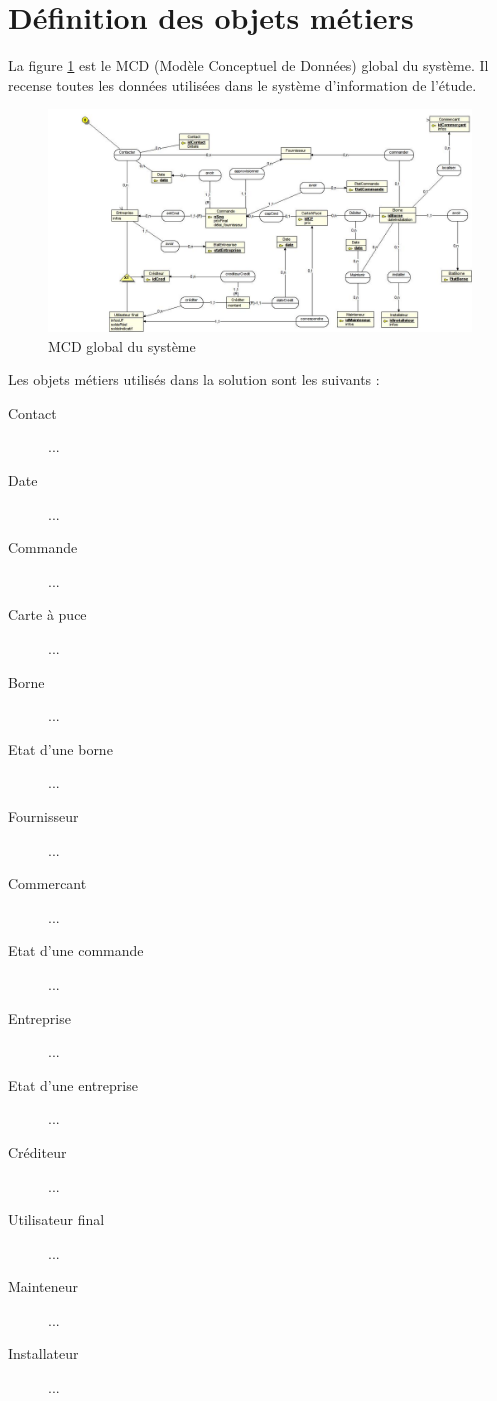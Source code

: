 




\section{Définition des objets métiers}
La figure \ref{fig:mcd} est le MCD (Modèle Conceptuel de Données) global du
système. Il recense toutes les données utilisées dans le système d'information
de l'étude. \\

\begin{landscape}
  \begin{figure}[ht]
      \centering
      \includegraphics[width=0.7\paperheight]{mcd}
      \caption{MCD global du système}
      \label{fig:mcd}
  \end{figure}
\end{landscape}

Les objets métiers utilisés dans la solution sont les suivants : \\
\begin{description}
  \item[Contact] ...
  \item[Date] ...
  \item[Commande] ...
  \item[Carte à puce] ...
  \item[Borne] ...
  \item[Etat d'une borne] ...
  \item[Fournisseur] ...
  \item[Commercant] ...
  \item[Etat d'une commande] ...
  \item[Entreprise] ...
  \item[Etat d'une entreprise] ...
  \item[Créditeur] ...
  \item[Utilisateur final] ...
  \item[Mainteneur] ...
  \item[Installateur] ...
\end{description}

